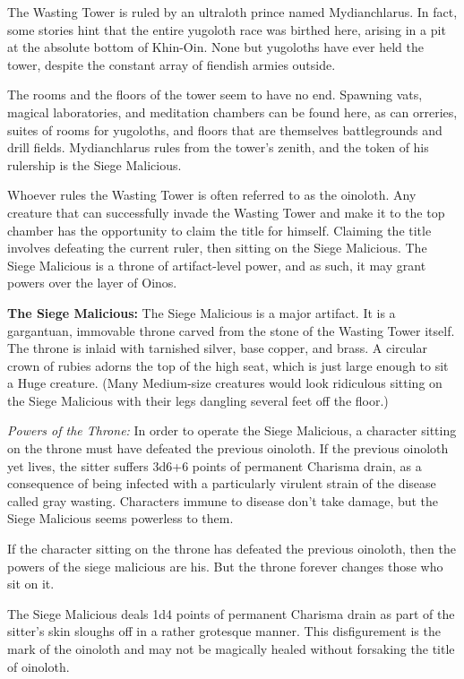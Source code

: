 The Wasting Tower is ruled by an ultraloth prince named Mydianchlarus. In fact, some stories hint that the entire yugoloth race was birthed here, arising in a pit at the absolute bottom of Khin-Oin. None but yugoloths have ever held the tower, despite the constant array of fiendish armies outside.

The rooms and the floors of the tower seem to have no end. Spawning vats, magical laboratories, and meditation chambers can be found here, as can orreries, suites of rooms for yugoloths, and floors that are themselves battlegrounds and drill fields. Mydianchlarus rules from the tower's zenith, and the token of his rulership is the Siege Malicious.

Whoever rules the Wasting Tower is often referred to as the oinoloth. Any creature that can successfully invade the Wasting Tower and make it to the top chamber has the opportunity to claim the title for himself. Claiming the title involves defeating the current ruler, then sitting on the Siege Malicious. The Siege Malicious is a throne of artifact-level power, and as such, it may grant powers over the layer of Oinos.

\textbf{The Siege Malicious:} The Siege Malicious is a major artifact. It is a gargantuan, immovable throne carved from the stone of the Wasting Tower itself. The throne is inlaid with tarnished silver, base copper, and brass. A circular crown of rubies adorns the top of the high seat, which is just large enough to sit a Huge creature. (Many Medium-size creatures would look ridiculous sitting on the Siege Malicious with their legs dangling several feet off the floor.)

\textit{Powers of the Throne:} In order to operate the Siege Malicious, a character sitting on the throne must have defeated the previous oinoloth. If the previous oinoloth yet lives, the sitter suffers 3d6+6 points of permanent Charisma drain, as a consequence of being infected with a particularly virulent strain of the disease called gray wasting. Characters immune to disease don't take damage, but the Siege Malicious seems powerless to them.

If the character sitting on the throne has defeated the previous oinoloth, then the powers of the siege malicious are his. But the throne forever changes those who sit on it.

The Siege Malicious deals 1d4 points of permanent Charisma drain as part of the sitter's skin sloughs off in a rather grotesque manner. This disfigurement is the mark of the oinoloth and may not be magically healed without forsaking the title of oinoloth.

